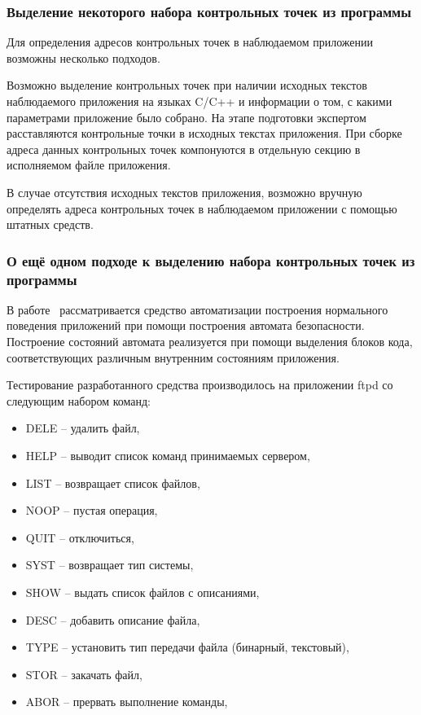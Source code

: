 \subsubsection{Выделение некоторого набора контрольных точек
                                                из программы}

Для определения адресов контрольных точек в наблюдаемом
приложении возможны несколько подходов.

Возможно выделение контрольных точек при наличии исходных текстов 
наблюдаемого приложения на языках C/C++ и информации о том, 
с какими параметрами приложение было собрано.
На этапе подготовки экспертом расставляются 
контрольные точки в исходных текстах приложения. 
При сборке адреса данных контрольных точек 
компонуются в отдельную секцию в исполняемом 
файле приложения. 

В случае отсутствия исходных текстов приложения,
возможно вручную определять адреса контрольных точек
в наблюдаемом приложении с помощью штатных средств.

\subsubsection{О ещё одном подходе к выделению
        набора контрольных точек из программы}

\bigskip 
В работе~ %
рассматривается средство автоматизации 
построения нормального поведения приложений при помощи
построения автомата безопасности.  Построение 
состояний автомата реализуется при помощи выделения 
блоков кода, соответствующих различным внутренним 
состояниям приложения. 

Тестирование разработанного средства производилось 
на приложении ftpd со следующим набором команд: 

\begin{itemize}
\item DELE -- удалить файл,
\item HELP -- выводит список команд принимаемых сервером,
\item LIST -- возвращает список файлов,
\item NOOP -- пустая операция,
\item QUIT -- отключиться,
\item SYST -- возвращает тип системы,
\item SHOW -- выдать список файлов с описаниями,
\item DESC -- добавить описание файла,
\item TYPE -- установить тип передачи файла (бинарный, текстовый),
\item STOR -- закачать файл,
\item ABOR -- прервать выполнение команды,
\end{itemize}

